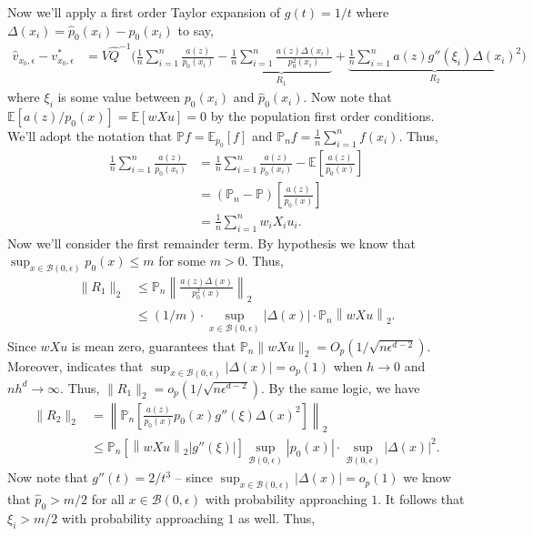 \documentclass[11pt]{article}
\begin{document}
Now we'll apply a first order Taylor expansion of $g(t) = 1/t$ where $\Delta(x_i) = \hat{p}_0(x_i) - p_0(x_i)$ to say,
\begin{align*}
    \hat{v}_{x_0, \epsilon} - v^*_{x_0, \epsilon} &= V\hat{Q}^{-1}\bigg(\frac{1}{n}\sum_{i = 1}^n\frac{a(z)}{p_0(x_i)} - \underbrace{\frac{1}{n}\sum_{i = 1}^n\frac{a(z)\Delta(x_i)}{p_0^2(x_i)}}_{R_1} + \underbrace{\frac{1}{n}\sum_{i = 1}^na(z) g''(\xi_i)\Delta(x_i)^2}_{R_2}\bigg)
\end{align*}
where $\xi_i$ is some value between $p_0(x_i)$ and $\hat{p}_0(x_i)$. Now note that $\mathbb{E}[a(z)/p_0(x)] = \mathbb{E}[wXu] = 0$ by the population first order conditions. We'll adopt the notation that $\mathbb{P}f = \mathbb{E}_{p_0}[f]$ and $\mathbb{P}_nf = \frac{1}{n}\sum_{i = 1}^nf(x_i)$. Thus,
\begin{align*}
    \frac{1}{n}\sum_{i = 1}^n\frac{a(z)}{p_0(x_i)} &= \frac{1}{n}\sum_{i = 1}^n\frac{a(z)}{p_0(x_i)} - \mathbb{E}\left[\frac{a(z)}{p_0(x)}\right] \\
    &= (\mathbb{P}_n -\mathbb{P})\left[\frac{a(z)}{p_0(x)}\right] \\
    &= \frac{1}{n}\sum_{i = 1}^n w_i X_i u_i.
\end{align*}
Now we'll consider the first remainder term. By hypothesis we know that $\sup_{x\in \mathcal{B}(0, \epsilon)}p_0(x) \leq m$ for some $m > 0$. Thus,
\begin{align*}
    \|R_1\|_2 &\leq \mathbb{P}_n\left\|\frac{a(z)\Delta(x)}{p^2_0(x)}\right\|_2 \\
    &\leq (1/m)\cdot \sup_{x\in \mathcal{B}(0, \epsilon)} \left|\Delta(x)\right|\cdot  \mathbb{P}_n\left\|wXu\right\|_2.
\end{align*}
Since $wXu$ is mean zero,  guarantees that $\mathbb{P}_n\|wXu\|_2 = O_p(1/\sqrt{n\epsilon^{d-2}})$. Moreover,  indicates that $\sup_{x\in \mathcal{B}(0, \epsilon)} \left|\Delta(x)\right| = o_p(1)$ when $h \rightarrow 0$ and $nh^d \rightarrow \infty$. Thus, $\|R_1\|_2 = o_p(1/\sqrt{n\epsilon^{d-2}})$. By the same logic, we have
\begin{align*}
    \|R_2\|_2 &= \left\|\mathbb{P}_n\left[\frac{a(z)}{p_0(x)}p_0(x)g''(\xi)\Delta(x)^2\right]\right\|_2\\
    &\leq \mathbb{P}_n[\left\|wXu\right\|_2|g''(\xi)|]\sup_{\mathcal{B}(0, \epsilon)}|p_0(x)|\cdot \sup_{\mathcal{B}(0, \epsilon)}|\Delta(x)|^2. 
\end{align*}
Now note that $g''(t) = 2/t^3$  -- since $\sup_{x\in \mathcal{B}(0, \epsilon)} \left|\Delta(x)\right| = o_p(1)$ we know that $\hat{p}_0 > m/2$ for all $x \in \mathcal{B}(0, \epsilon)$ with probability approaching $1$. It follows that $\xi_i > m/2$ with probability approaching $1$ as well. Thus,
\end{document}
